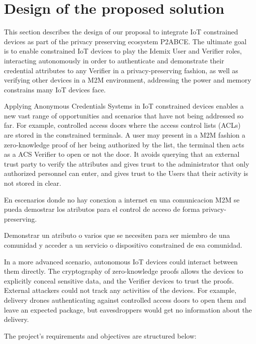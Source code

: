 
\section{Design of the proposed solution}\label{ch:design}

This section describes the design of our proposal to integrate IoT constrained devices as part of the privacy preserving ecosystem P2ABCE. The ultimate goal is to enable constrained IoT devices to play the Idemix User and Verifier roles, interacting autonomously in order to authenticate and demonstrate their credential attributes to any Verifier in a privacy-preserving fashion, as well as verifying other devices in a M2M environment, addressing the power and memory constrains many IoT devices face. 

Applying Anonymous Credentials Systems in IoT constrained devices enables a new vast range of opportunities and scenarios that have not being addressed so far. For example, controlled access doors where the access control lists (ACLs) are stored in the constrained terminals. A user may present in a M2M fashion a zero-knowledge proof of her being authorized by the list, the terminal then acts as a ACS Verifier to open or not the door. It avoids querying that an external trust party to verify the attributes and gives trust to the administrator that only authorized personnel can enter, and gives trust to the Users that their activity is not stored in clear. 


En escenarios donde no hay conexion a internet en una comunicacion M2M se pueda demostrar los atributos para el control de acceso de forma privacy-preserving.

Demonstrar un atributo o varios que se necesiten para ser miembro de una comunidad y acceder a un servicio o dispositivo constrained de esa comunidad.


In a more advanced scenario, autonomous IoT devices could interact between them directly. The cryptography of zero-knowledge proofs allows the devices to explicitly conceal sensitive data, and the Verifier devices to trust the proofs. External attackers could not track any activities of the devices. For example, delivery drones authenticating against controlled access doors to open them and leave an expected package, but eavesdroppers would get no information about the delivery.

The project's requirements and objectives are structured below:

